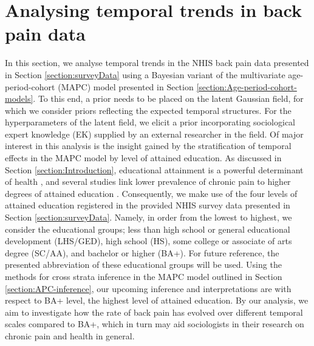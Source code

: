 \section{Analysing temporal trends in back pain data}
\label{section:Application1}
In this section, we analyse temporal trends in the NHIS back pain data presented in Section \ref{section:surveyData} using a Bayesian variant of the multivariate age-period-cohort (MAPC) model presented in Section \ref{section:Age-period-cohort-models}. To this end, a prior needs to be placed on the latent Gaussian field, for which we consider priors reflecting the expected temporal structures. For the hyperparameters of the latent field, we elicit a prior incorporating sociological expert knowledge (EK) supplied by an external researcher in the field. Of major interest in this analysis is the insight gained by the stratification of temporal effects in the MAPC model by level of attained education. As discussed in Section \ref{section:Introduction}, educational attainment is a powerful determinant of health \citep{mirowsky2017education}, and several studies link lower prevalence of chronic pain to higher degrees of attained education \citep{dionne2001formal,kennedy2014prevalence}. Consequently, we make use of the four levels of attained education registered in the provided NHIS survey data presented in Section \ref{section:surveyData}. Namely, in order from the lowest to highest, we consider the educational groups; less than high school or general educational development (LHS/GED), high school (HS), some college or associate of arts degree (SC/AA), and bachelor or higher (BA+). For future reference, the presented abbreviation of these educational groups will be used. Using the methods for cross strata inference in the MAPC model outlined in Section \ref{section:APC-inference}, our upcoming inference and interpretations are with respect to BA+ level, the highest level of attained education. By our analysis, we aim to investigate how the rate of back pain has evolved over different temporal scales compared to BA+, which in turn may aid sociologists in their research on chronic pain and health in general.

